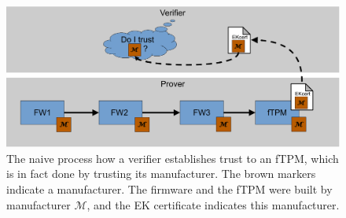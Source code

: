 \begin{figure}[htpb]
  \centering
  \includegraphics[width=1\linewidth]{figures/current_state.pdf}
  \caption{The naive process how a verifier establishes trust to an \ac{fTPM}, which is in fact done by trusting its manufacturer. The brown markers indicate a manufacturer. The firmware and the fTPM were built by manufacturer $\mathcal{M}$, and the EK certificate indicates this manufacturer.} \label{fig:current_state}
\end{figure}
